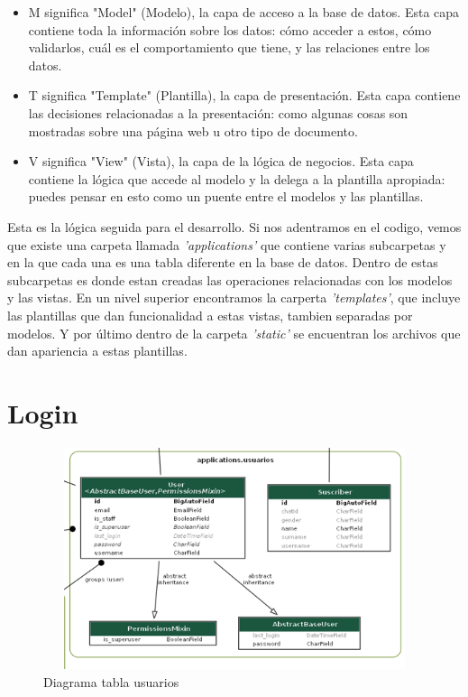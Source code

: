 \begin{itemize}

\item M significa "Model" (Modelo), la capa de acceso a la base de datos. Esta capa contiene toda la información sobre los datos: cómo acceder a estos, cómo validarlos, cuál es el comportamiento que tiene, y las relaciones entre los datos.

\item T significa "Template" (Plantilla), la capa de presentación. Esta capa contiene las decisiones relacionadas a la presentación: como algunas cosas son mostradas sobre una página web u otro tipo de documento.

\item V significa "View" (Vista), la capa de la lógica de negocios. Esta capa contiene la lógica que accede al modelo y la delega a la plantilla apropiada: puedes pensar en esto como un puente entre el modelos y las plantillas.

\end{itemize}

Esta es la lógica seguida para el desarrollo. Si nos adentramos en el codigo, vemos que existe una carpeta llamada \textit{'applications'} que contiene varias subcarpetas y en la que cada una es una tabla diferente en la base de datos. Dentro de estas subcarpetas es donde estan creadas las operaciones relacionadas con los modelos y las vistas. En un nivel superior encontramos la carperta \textit{'templates'}, que incluye las plantillas que dan funcionalidad a estas vistas, tambien separadas por modelos. Y por último dentro de la carpeta \textit{'static'} se encuentran los archivos que dan apariencia a estas plantillas.



\section{Login}


\begin{figure}[!ht]
    \centering
    \includegraphics[width=1\textwidth, height=6.5cm]{imagenes/usuarios.png}
    \caption{ Diagrama tabla usuarios }
    \label{fig:usuarios}
\end{figure}

